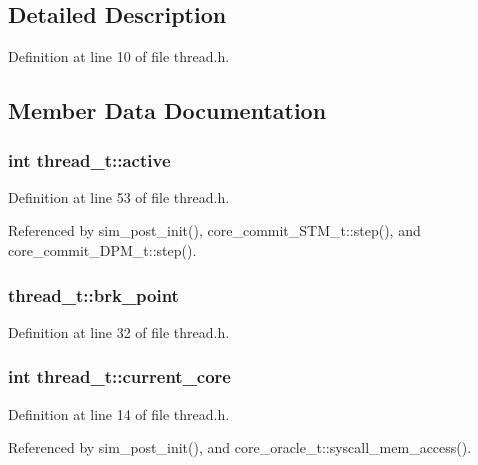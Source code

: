 \subsection{Detailed Description}


Definition at line 10 of file thread.h.

\subsection{Member Data Documentation}
\subsubsection[{active}]{\setlength{\rightskip}{0pt plus 5cm}int {\bf thread\_\-t::active}}\label{structthread__t_47c204871c8aecc186222de0093d15b9}




Definition at line 53 of file thread.h.

Referenced by sim\_\-post\_\-init(), core\_\-commit\_\-STM\_\-t::step(), and core\_\-commit\_\-DPM\_\-t::step().
\subsubsection[{brk\_\-point}]{ {\bf thread\_\-t::brk\_\-point}}\label{structthread__t_9e668c7ba65c996e9f6175fb95199bea}




Definition at line 32 of file thread.h.
\subsubsection[{current\_\-core}]{\setlength{\rightskip}{0pt plus 5cm}int {\bf thread\_\-t::current\_\-core}}\label{structthread__t_fe142c06b5866f3f0c7cecdcb09dd4b2}




Definition at line 14 of file thread.h.

Referenced by sim\_\-post\_\-init(), and core\_\-oracle\_\-t::syscall\_\-mem\_\-access().
